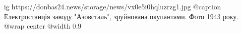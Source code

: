  
 
 
 
 

\ifcmt
  ig https://donbas24.news/storage/news/vx0e5i0hqluzrzg1.jpg
	@caption Електростанція заводу "Азовсталь", зруйнована окупантами. Фото 1943 року.
  @wrap center
  @width 0.9
\fi
